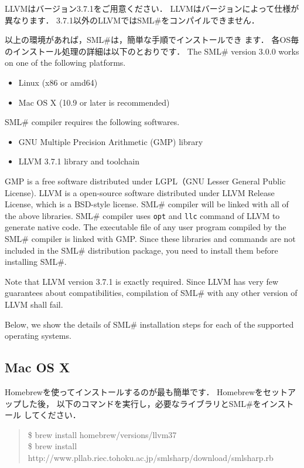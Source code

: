 \documentclass{jbook}
\newif\ifjp
\newcommand{\txt}[2]{#2}
\newcommand{\smlsharp}{SML\#}
\newcommand{\version}{3.0.0}
\newenvironment{program}{\begin{quote}\begin{tt}}%
                        {\end{tt}\end{quote}}
\begin{document}
	LLVMはバージョン3.7.1をご用意ください．
	LLVMはバージョンによって仕様が異なります．
	3.7.1以外のLLVMでは\smlsharp{}をコンパイルできません．

	以上の環境があれば，\smlsharp{}は，簡単な手順でインストールでき
ます．
	各OS毎のインストール処理の詳細は以下のとおりです．
\else%
	The \smlsharp{} version \version{} works on one of the following
platforms.
\begin{itemize}
\item Linux (x86 or amd64)
\item Mac OS X (10.9 or later is recommended)
\end{itemize}

	\smlsharp{} compiler requires the following softwares.
\begin{itemize}
\item GNU Multiple Precision Arithmetic (GMP) library
\item LLVM 3.7.1 library and toolchain
\end{itemize}
	GMP is a free software distributed under LGPL（GNU Lesser General
Public License).
	LLVM is a open-source software distributed under LLVM Release License,
which is a BSD-style license.
	\smlsharp{} compiler will be linked with all of the above libraries.
	\smlsharp{} compiler uses {\tt opt} and {\tt llc} command of
LLVM to generate native code.
	The executable file of any user program compiled by the \smlsharp{}
compiler is linked with GMP.
	Since these libraries and commands are not included in the \smlsharp{}
distribution package,
you need to install them before installing \smlsharp.

	Note that LLVM version 3.7.1 is exactly required.
	Since LLVM has very few guarantees about compatibilities,
compilation of \smlsharp{} with any other version of LLVM shall fail.

	Below, we show the details of \smlsharp{} installation steps for
each of the supported operating systems.
\fi%

\subsection{\txt{Mac OS X}{Mac OS X}}
\ifjp%
	Homebrewを使ってインストールするのが最も簡単です．
	Homebrewをセットアップした後，
以下のコマンドを実行し，必要なライブラリと\smlsharp{}をインストール
してください．
\begin{program}
\$ brew install homebrew/versions/llvm37\\
\$ brew install http://www.pllab.riec.tohoku.ac.jp/smlsharp/download/smlsharp.rb
\end{program}
\end{document}
